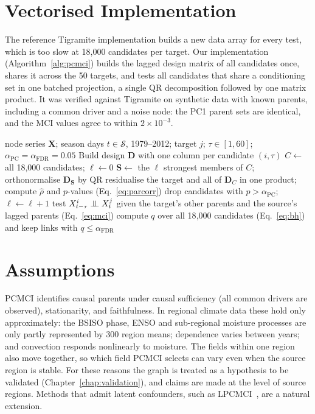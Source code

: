 \section{Vectorised Implementation}
\label{sec:pcmci-compute}

The reference Tigramite implementation builds a new data array for every test, which is too slow at 18{,}000 candidates per target. Our implementation (Algorithm~\ref{alg:pcmci}) builds the lagged design matrix of all candidates once, shares it across the 50 targets, and tests all candidates that share a conditioning set in one batched projection, a single QR decomposition followed by one matrix product. It was verified against Tigramite on synthetic data with known parents, including a common driver and a noise node: the PC1 parent sets are identical, and the MCI values agree to within $2\times10^{-3}$.

\begin{algorithm}[htbp]
\caption{Vectorised PCMCI for one OLR target}
\label{alg:pcmci}
\small
\begin{algorithmic}[1]
\Require node series $\mathbf{X}$; season days $t\in\mathcal{S}$, 1979--2012; target $j$; $\tau\in[1,60]$; $\alpha_{\mathrm{PC}}=\alpha_{\mathrm{FDR}}=0.05$
\State Build design $\mathbf{D}$ with one column per candidate $(i,\tau)$ 
\State $C\gets$ all 18{,}000 candidates; $\ell\gets0$
 
  \State $\mathbf{S}\gets$ the $\ell$ strongest members of $C$; orthonormalise $\mathbf{D}_{\mathbf{S}}$ by QR
  \State residualise the target and all of $\mathbf{D}_C$ in one product; compute $\hat\rho$ and $p$-values (Eq.~\ref{eq:parcorr})
  \State drop candidates with $p>\alpha_{\mathrm{PC}}$; $\ell\gets \ell+1$
\EndWhile
{} 
  \State test $X^i_{t-\tau}\mathrel{\perp\!\!\!\perp} X^j_t$ given the target's other parents and the source's lagged parents (Eq.~\ref{eq:mci})
\EndFor
\State compute $q$ over all 18{,}000 candidates (Eq.~\ref{eq:bh}) and keep links with $q\le\alpha_{\mathrm{FDR}}$
\end{algorithmic}
\end{algorithm}

\section{Assumptions}
\label{sec:pcmci-assumptions}

PCMCI identifies causal parents under causal sufficiency (all common drivers are observed), stationarity, and faithfulness. In regional climate data these hold only approximately: the BSISO phase, ENSO and sub-regional moisture processes are only partly represented by 300 region means; dependence varies between years; and convection responds nonlinearly to moisture. The fields within one region also move together, so which field PCMCI selects can vary even when the source region is stable. For these reasons the graph is treated as a hypothesis to be validated (Chapter~\ref{chap:validation}), and claims are made at the level of source regions. Methods that admit latent confounders, such as LPCMCI~\cite{gerhardus2020high}, are a natural extension.

